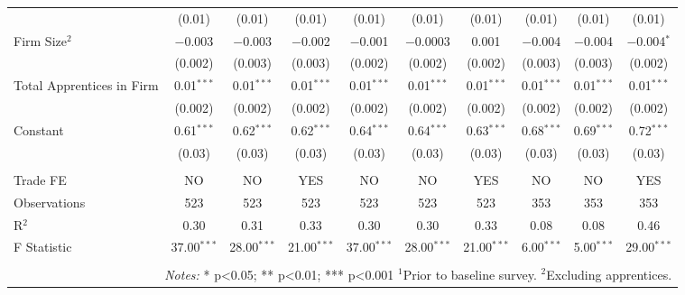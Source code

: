 \documentclass[
  11pt,
a4paper
]{report}
\begin{document}
\begin{adjustbox}{center}
\begin{table}[H]
\begin{tabular}{@{\extracolsep{-8pt}}lccccccccc}
  & (0.01) & (0.01) & (0.01) & (0.01) & (0.01) & (0.01) & (0.01) & (0.01) & (0.01) \\ 
  Firm Size$^2$ & $-$0.003 & $-$0.003 & $-$0.002 & $-$0.001 & $-$0.0003 & 0.001 & $-$0.004 & $-$0.004 & $-$0.004$^{*}$ \\ 
  & (0.002) & (0.003) & (0.003) & (0.002) & (0.002) & (0.002) & (0.003) & (0.003) & (0.002) \\ 
  Total Apprentices in Firm & 0.01$^{***}$ & 0.01$^{***}$ & 0.01$^{***}$ & 0.01$^{***}$ & 0.01$^{***}$ & 0.01$^{***}$ & 0.01$^{***}$ & 0.01$^{***}$ & 0.01$^{***}$ \\ 
  & (0.002) & (0.002) & (0.002) & (0.002) & (0.002) & (0.002) & (0.002) & (0.002) & (0.002) \\ 
  Constant & 0.61$^{***}$ & 0.62$^{***}$ & 0.62$^{***}$ & 0.64$^{***}$ & 0.64$^{***}$ & 0.63$^{***}$ & 0.68$^{***}$ & 0.69$^{***}$ & 0.72$^{***}$ \\ 
  & (0.03) & (0.03) & (0.03) & (0.03) & (0.03) & (0.03) & (0.03) & (0.03) & (0.03) \\ 
 \hline \\[-1.8ex] 
Trade FE & NO & NO & YES & NO & NO & YES & NO & NO & YES \\ 
Observations & 523 & 523 & 523 & 523 & 523 & 523 & 353 & 353 & 353 \\ 
R$^{2}$ & 0.30 & 0.31 & 0.33 & 0.30 & 0.30 & 0.33 & 0.08 & 0.08 & 0.46 \\ 
F Statistic & 37.00$^{***}$ & 28.00$^{***}$ & 21.00$^{***}$ & 37.00$^{***}$ & 28.00$^{***}$ & 21.00$^{***}$ & 6.00$^{***}$ & 5.00$^{***}$ & 29.00$^{***}$ \\ 
\hline 
\hline \\[-1.8ex] 
\multicolumn{10}{r}{\parbox[t]{\textwidth}{\textit{Notes:} * p<0.05; ** p<0.01; *** p<0.001 \\ $^1$Prior to baseline survey. \\ $^2$Excluding apprentices.}} \\ 
\end{tabular} 
\end{table} 



\end{adjustbox}
\end{document}
